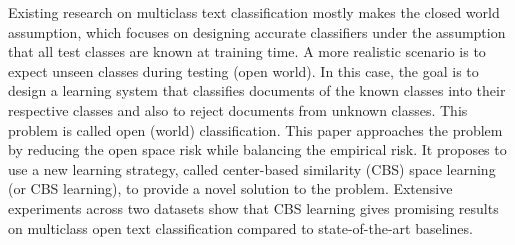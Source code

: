 Existing research on multiclass text classification mostly makes the closed world assumption, which focuses on designing accurate classifiers under the assumption that all test classes are known at training time. A more realistic scenario is to expect unseen classes during testing (open world). In this case, the goal is to design a learning system that classifies documents of the known classes into their respective classes and also to reject documents from unknown classes. This problem is called open (world) classification. This paper approaches the problem by reducing the open space risk while balancing the empirical risk. It proposes to use a new learning strategy, called center-based similarity (CBS) space learning (or CBS learning), to provide a novel solution to the problem. Extensive experiments across two datasets show that CBS learning gives promising results on multiclass open text classification compared to state-of-the-art baselines.
